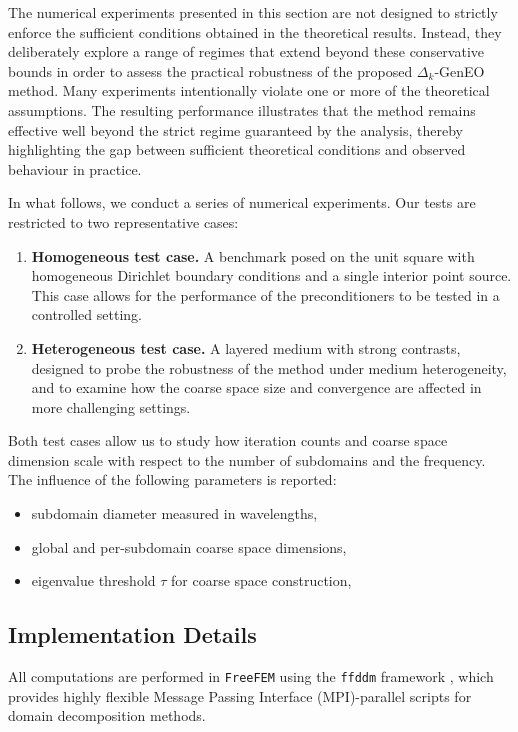 \documentclass[preprint,3p,times]{elsarticle}
\theoremstyle{definition}
\numberwithin{equation}{section}
\begin{document}
{The numerical experiments presented in this section are not designed to strictly enforce the sufficient conditions obtained in the theoretical results. 
Instead, they deliberately explore a range of regimes that extend beyond these conservative bounds in order to assess the practical robustness of the proposed $\Delta_k$-GenEO method. 
Many experiments intentionally violate one or more of the theoretical assumptions. 
The resulting performance illustrates that the method remains effective well beyond the strict regime guaranteed by the analysis, thereby highlighting the gap between sufficient theoretical conditions and observed behaviour in practice.
}

{In what follows}, we conduct a series of numerical experiments. Our tests are restricted to two representative cases:
\begin{enumerate}
\item \textbf{Homogeneous test case.}  
A benchmark posed on the unit square with homogeneous Dirichlet boundary conditions and a single interior point source. 
This case allows for the performance of the preconditioners to be tested in a controlled setting.  

\item \textbf{Heterogeneous test case.}  
A layered medium with strong contrasts, designed to probe the robustness of the method under medium heterogeneity, 
and to examine how the coarse space size and convergence are affected in more challenging settings.  
\end{enumerate}

Both test cases allow us to study how iteration counts and coarse space dimension scale with respect to the 
number of subdomains and the frequency. The influence of the following parameters is reported:  
\begin{itemize}
  \item subdomain diameter measured in wavelengths,
  \item global and per-subdomain coarse space dimensions,
  \item eigenvalue threshold $\tau$ for coarse space construction,
\end{itemize}


\subsection{Implementation Details}
All computations are performed in \texttt{FreeFEM} using the \texttt{ffddm} framework \cite{FFD:Tournier:2019},
which provides highly flexible Message Passing Interface (MPI)-parallel scripts for domain decomposition methods. 
\end{document}
